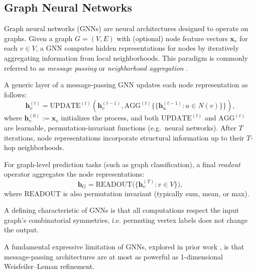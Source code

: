 
\subsection{Graph Neural Networks}
\label{subsec:GNNs}

Graph neural networks (GNNs) are neural architectures designed to operate on graphs.
Given a graph $G = (V,E)$ with (optional) node feature vectors $\mathbf{x}_v$ for each
$v \in V$, a GNN computes hidden representations for nodes by iteratively aggregating
information from local neighborhoods. This paradigm is commonly referred to as
\emph{message passing} or \emph{neighborhood aggregation}
\citep{HamiltonEtAl2017, Kipf2016, GilmerEtAl2017}.

A generic layer of a message-passing GNN updates each node representation as follows:
\[
\mathbf{h}_v^{(t)} = 
\mathrm{UPDATE}^{(t)} \!\left(
    \mathbf{h}_v^{(t-1)},
    \mathrm{AGG}^{(t)}\bigl\{\!\!\{ \mathbf{h}_u^{(t-1)} : u \in N(v)\}\!\! \bigr\}
\right),
\]
where $\mathbf{h}_v^{(0)} := \mathbf{x}_v$ initializes the process,
and both $\mathrm{UPDATE}^{(t)}$ and $\mathrm{AGG}^{(t)}$ are learnable,
permutation-invariant functions (e.g.\ neural networks).
After $T$ iterations, node representations incorporate structural information up to
their $T$-hop neighborhoods.

For graph-level prediction tasks (such as graph classification),
a final \emph{readout} operator aggregates the node representations:
\[
\mathbf{h}_G 
    = \mathrm{READOUT}\bigl(\{\mathbf{h}_v^{(T)} : v \in V\}\bigr),
\]
where $\mathrm{READOUT}$ is also permutation invariant (typically sum, mean, or max).

A defining characteristic of GNNs is that all computations respect the input
graph’s combinatorial symmetries, i.e. permuting vertex labels does not change the output.

A fundamental expressive limitation of GNNs, explored in prior work
\citep{XuEtAl2019, MorrisEtAl2019}, is that message-passing architectures are at most as powerful as 1-dimensional Weisfeiler--Leman refinement.

